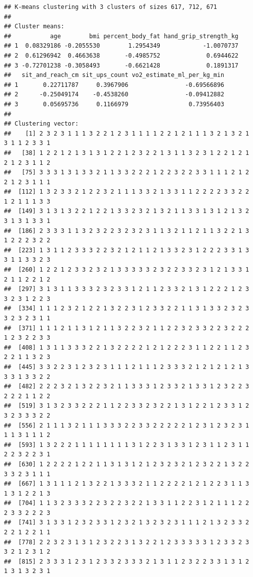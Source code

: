 \documentclass[
]{article}
\begin{document}
\begin{verbatim}
## K-means clustering with 3 clusters of sizes 617, 712, 671
## 
## Cluster means:
##           age        bmi percent_body_fat hand_grip_strength_kg
## 1  0.08329186 -0.2055530        1.2954349            -1.0070737
## 2  0.61296942  0.4663638       -0.4985752             0.6944622
## 3 -0.72701238 -0.3058493       -0.6621428             0.1891317
##   sit_and_reach_cm sit_ups_count vo2_estimate_ml_per_kg_min
## 1       0.22711787     0.3967906                -0.69566896
## 2      -0.25049174    -0.4538260                -0.09412882
## 3       0.05695736     0.1166979                 0.73956403
## 
## Clustering vector:
##    [1] 2 3 2 3 1 1 1 3 2 2 1 2 3 1 1 1 1 2 2 1 2 1 1 1 3 2 1 3 2 1 3 1 1 2 3 3 1
##   [38] 1 2 2 1 2 1 3 1 3 1 2 2 1 2 3 2 2 1 3 1 1 3 2 3 1 2 2 1 2 1 2 1 2 3 1 1 2
##   [75] 3 3 3 1 3 1 3 3 2 1 1 3 3 2 2 2 1 2 2 3 2 2 3 3 1 1 1 2 1 2 2 1 2 3 1 1 1
##  [112] 1 3 2 3 3 2 1 2 2 3 2 1 1 1 3 3 2 1 3 3 1 1 2 2 2 2 3 3 2 2 1 2 1 1 1 3 3
##  [149] 3 1 3 1 3 2 2 1 2 2 1 3 3 2 3 2 1 3 2 1 1 3 3 1 3 1 2 1 3 2 3 1 3 1 3 3 1
##  [186] 2 3 3 3 1 1 3 2 3 2 2 3 2 3 2 3 1 1 3 2 1 1 2 1 1 3 2 2 1 3 1 2 2 2 3 2 2
##  [223] 1 3 1 1 2 3 3 3 2 2 3 2 1 2 1 1 2 1 3 3 2 3 1 2 2 2 3 3 1 3 3 1 1 3 3 2 3
##  [260] 1 2 2 1 2 3 3 2 3 2 1 3 3 3 3 3 2 3 2 2 3 3 2 3 1 2 1 3 3 1 2 1 1 2 2 1 2
##  [297] 3 1 3 1 1 3 3 3 2 3 2 3 3 1 2 1 1 2 3 3 2 1 3 1 2 2 2 1 2 3 3 2 3 1 2 2 3
##  [334] 1 1 1 2 3 2 1 2 2 1 3 2 2 3 1 2 3 3 2 2 1 1 3 1 3 3 2 3 2 3 3 2 3 2 3 1 1
##  [371] 1 1 1 2 1 1 3 1 2 1 1 3 2 2 3 2 1 1 2 2 3 2 3 3 2 2 3 2 2 2 1 2 3 2 2 3 3
##  [408] 1 3 1 1 3 3 3 2 2 1 3 2 2 2 2 1 2 1 2 2 2 3 1 1 2 2 1 1 2 3 2 2 1 1 3 2 3
##  [445] 3 3 2 2 3 1 2 3 2 3 1 1 1 2 1 1 1 2 3 3 3 2 1 2 1 2 1 2 1 3 3 3 1 3 3 2 2
##  [482] 2 2 2 3 2 1 3 2 2 3 2 1 1 3 3 3 1 2 3 3 2 1 3 3 1 2 3 2 2 3 2 2 2 1 1 2 2
##  [519] 3 1 3 2 3 3 2 2 2 1 1 2 2 3 3 2 3 2 2 1 3 1 2 2 1 2 3 3 1 2 3 2 3 3 3 2 2
##  [556] 2 1 1 1 3 2 1 1 1 3 3 3 2 2 3 3 2 2 2 2 2 1 2 3 1 2 3 2 3 1 1 1 3 1 1 1 2
##  [593] 1 3 2 2 2 1 1 1 1 1 1 1 1 3 1 2 2 3 1 3 3 1 2 3 1 1 2 3 1 1 2 2 3 2 2 3 1
##  [630] 1 2 2 2 2 1 2 2 1 1 3 1 3 1 2 1 2 3 2 3 2 1 2 3 2 2 1 3 2 2 3 3 2 3 1 1 1
##  [667] 1 3 1 1 1 2 1 3 2 2 1 3 3 3 2 1 1 2 2 2 2 1 2 1 2 2 3 1 1 3 1 3 1 2 2 1 3
##  [704] 1 1 3 2 3 3 3 2 2 3 2 2 3 2 2 1 3 3 1 1 2 2 3 1 2 1 1 1 2 2 2 3 3 2 2 2 3
##  [741] 3 1 3 3 1 2 3 2 3 3 1 2 3 2 1 3 2 3 2 3 1 1 1 2 1 3 2 3 3 2 2 2 1 2 2 1 1
##  [778] 2 2 3 2 3 1 3 1 2 3 2 2 3 1 3 2 2 1 2 3 3 3 3 3 1 2 3 3 2 3 3 2 1 2 3 1 2
##  [815] 2 3 3 3 1 2 3 1 2 3 3 2 3 3 3 2 1 3 1 1 2 3 2 2 3 3 1 3 1 2 1 3 1 3 2 3 1

\end{verbatim}
\end{document}
